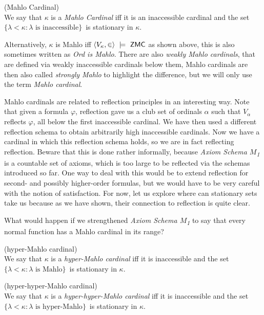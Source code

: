 \begin{definition}{(Mahlo Cardinal)}\label{def:mahlo_cardinal}\\
We say that $\kappa$ is a \emph{Mahlo Cardinal} iff it is an inaccessible cardinal and the set $\{\lambda < \kappa : \lambda \mbox{ is inaccessible}\}$ is stationary in $\kappa$.
\end{definition}

Alternatively, $\kappa$ is Mahlo iff $\langle V_\kappa, \in \rangle~\models~\sf{ZMC}$ as shown above, this is also sometimes written as \emph{Ord is Mahlo}. There are also \emph{weakly Mahlo cardinals}, that are defined via weakly inaccessible cardinals below them, Mahlo cardinals are then also called \emph{strongly Mahlo} to highlight the difference, but we will only use the term \emph{Mahlo cardinal}.

Mahlo cardinals are related to reflection principles in an interesting way. Note that given a formula $\varphi$, reflection gave us a club set of ordinals $\alpha$ such that $V_\alpha$ reflects $\varphi$, all below the first inaccessible cardinal. We have then used a different reflection schema to obtain arbitrarily high inaccessible cardinals. Now we have a cardinal in which this reflection schema holds, so we are in fact reflecting reflection. Beware that this is done rather informally, because \emph{Axiom Schema $M$\textsubscript{1}} is a countable set of axioms, which is too large to be reflected via the schemas introduced so far. One way to deal with this would be to extend reflection for second- and possibly higher-order formulas, but we would have to be very careful with the notion of satisfaction. For now, let us explore where can stationary sets take us because as we have shown, their connection to reflection is quite clear.

What would happen if we strengthened \emph{Axiom Schema $M$\textsubscript{1}} to say that every normal function has a Mahlo cardinal in its range?

\begin{definition}{(hyper-Mahlo cardinal)}\label{def:hyper_mahlo_cardinal}\\
We say that $\kappa$ is a \emph{hyper-Mahlo cardinal} iff it is inaccessible and the set $\{\lambda < \kappa : \lambda \mbox{ is Mahlo}\}$ is stationary in $\kappa$.
\end{definition}

\begin{definition}{(hyper-hyper-Mahlo cardinal)}\label{def:hyper_hyper_mahlo_cardinal}\\
We say that $\kappa$ is a \emph{hyper-hyper-Mahlo cardinal} iff it is inaccessible and the set $\{\lambda < \kappa : \lambda \mbox{ is hyper-Mahlo}\}$ is stationary in $\kappa$.
\end{definition}

